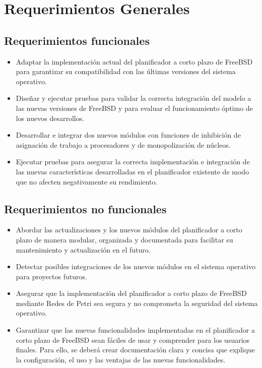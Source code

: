 \section{Requerimientos Generales}

\subsection{Requerimientos funcionales}
\begin{itemize}
    \item Adaptar la implementación actual del planificador a corto plazo de FreeBSD para garantizar su compatibilidad con las últimas versiones del sistema operativo.
    \item Diseñar y ejecutar pruebas para validar la correcta integración del modelo a las nuevas versiones de FreeBSD y para evaluar el funcionamiento óptimo de los nuevos desarrollos.
    \item Desarrollar e integrar dos nuevos módulos con funciones de inhibición de asignación de trabajo a procesadores y de monopolización de núcleos.
    \item Ejecutar pruebas para asegurar la correcta implementación e integración de las nuevas características desarrolladas en el planificador existente de modo que no afecten negativamente su rendimiento.
\end{itemize}

\subsection{Requerimientos no funcionales}
\begin{itemize}
    \item Abordar las actualizaciones y los nuevos módulos del planificador a corto plazo de manera modular, organizada y documentada para facilitar su mantenimiento y actualización en el futuro.
    \item Detectar posibles integraciones de los nuevos módulos en el sistema operativo para proyectos futuros.
    \item Asegurar que la implementación del planificador a corto plazo de FreeBSD mediante Redes de Petri sea segura y no comprometa la seguridad del sistema operativo.
    \item Garantizar que las nuevas funcionalidades implementadas en el planificador a corto plazo de FreeBSD sean fáciles de usar y comprender para los usuarios finales. Para ello, se deberá crear documentación clara y concisa que explique la configuración, el uso y las ventajas de las nuevas funcionalidades.
\end{itemize}
